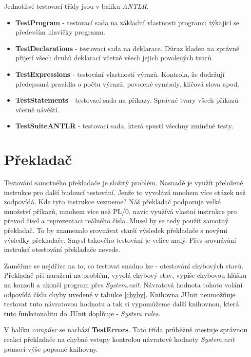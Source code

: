 \documentclass[
12pt,
a4paper,
pdftex,
czech,
titlepage
]{report}
\begin{document}
Jednotlivé testovací třídy jsou v balíku \textit{ANTLR}.
\begin{itemize}
\item \textbf{TestProgram} - testovací sada na základní vlastnosti programu týkající se především hlavičky programu.
\item \textbf{TestDeclarations} - testovací sada na deklarace. Důraz kladen na správné přijetí všech druhů deklarací včetně všech jejich povolených tvarů.
\item \textbf{TestExpressions} - testování vlastností výrazů. Kontrola, že dodržují předepsaná pravidla o počtu výrazů, povolené symboly, klíčová slova apod.
\item \textbf{TestStatements} - testovací sada na příkazy. Správné tvary všech příkazů včetně návěští.
\item \textbf{TestSuiteANTLR} - testovací sada, která spustí všechny zmíněné testy.
\end{itemize} 

\section{Překladač}

Testování samotného překladače je složitý problém. Nasnadě je využít přeložené instrukce pro další budoucí testování. Jenže to vyvolává mnohem více otázek než zodpovídá. Kde tyto instrukce vezmeme? Náš překladač podporuje velké množství příkazů, mnohem více než PL/0, navíc využívá vlastní instrukce pro převod čísel a reprezentaci reálného čísla. Musel by se tedy použít samotný překladač. To by znamenalo srovnávat starší výsledek překladače s novými výsledky překladače. Smysl takového testování je velice malý. Přes srovnávání instrukcí otestování překladače nevede. 


Zaměřme se nejdříve na to, co testovat snadno lze - otestování chybových stavů. Překladač při naražení na problém, vyvolá chybový stav, vypíše chybovou hlášku na konzoli a ukončí program přes \textit{System.exit}. Návratová hodnota tohoto volání odpovídá číslu chyby uvedené v tabulce \ref{chyby}. Knihovna JUnit neumožňuje testovat tuto návratovou hodnotu a tak si vypomůžeme další knihovnou, která tuto funkcionalitu do JUnit doplňuje - \textit{System rules}. 

V balíku \textit{compiler} se nachází \textbf{TestErrors}. Tato třída průběžně otestuje správnou reakci překladače na chybné vstupy kontrolou návratové hodnoty \textit{System.exit} pomocí výše popsané knihovny.
\end{document}
